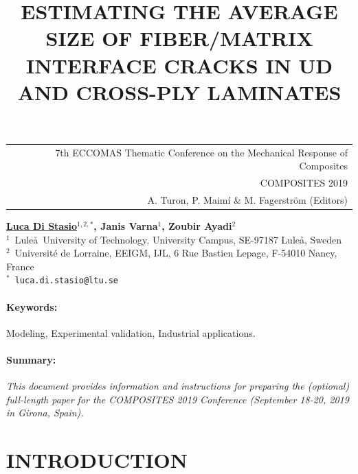 \documentclass[12pt,a4paper]{article}
\begin{document}
\thispagestyle{empty}

\vspace*{-3.4cm}
\begin{table}[!h]
\begin{tabular}{r}
\hspace*{5.5cm} \scriptsize \textsf{7th ECCOMAS Thematic Conference on the Mechanical Response of Composites} \\
\hspace*{5.5cm} \scriptsize \textsf{ COMPOSITES 2019} \\
\hspace*{5.5cm} \tiny \textsf{A. Turon, P. Maimí \& M. Fagerström (Editors)}
\end{tabular}
\end{table}

\begin{center}
\title{ESTIMATING THE AVERAGE SIZE OF FIBER/MATRIX INTERFACE CRACKS IN UD AND CROSS-PLY LAMINATES}
\end{center}
\begin{center}
\textbf{\underline{Luca Di Stasio}$^{1,2,*}$, Janis Varna$^{1}$, Zoubir Ayadi$^{2}$} \\ [7pt]
\small{$^1$~Lule\aa\ University of Technology, University Campus, SE-97187 Lule\aa, Sweden}  \\  [2pt]  
\small{$^2$~Universit\'e de Lorraine, EEIGM, IJL, 6 Rue Bastien Lepage, F-54010 Nancy, France}  \\  [2pt]
\small{$^*$~\texttt{luca.di.stasio@ltu.se}} \\
\end{center}


\paragraph{Keywords:} Modeling, Experimental validation, Industrial applications.

\paragraph{Summary:} \textit{This document provides information and instructions for preparing the (optional) full-length paper for the COMPOSITES 2019 Conference (September 18-20, 2019 in Girona, Spain).}

\section{INTRODUCTION}
\end{document}
